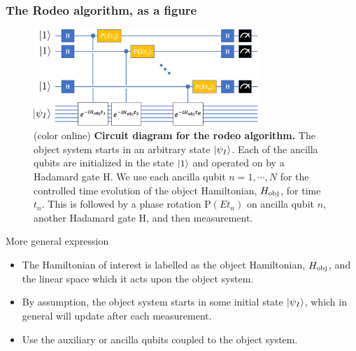 \documentclass{beamer}
\begin{document}
\begin{frame}
\frametitle{The Rodeo algorithm, as a figure}

\begin{figure}
\centering
\includegraphics[width=8.5cm]{rodeofigs/rodeo_circuit.png}
\caption{(color online) {\bf Circuit diagram for the rodeo algorithm.} The object system starts in an arbitrary state $\ket{\psi_I}$.  Each of the ancilla qubits are initialized in the state $\ket{1}$ and operated on by a Hadamard gate H.  We use each ancilla qubit $n=1, \cdots, N$ for the controlled time evolution of the object Hamiltonian, $H_{\rm obj}$, for time $t_n$.  This is followed by a phase rotation P$(Et_n)$ on ancilla qubit $n$, another Hadamard gate H, and then measurement.}
\label{rodeo_circuit}
\end{figure} 

\end{frame}

\begin{frame}{More general expression}
\begin{itemize}
\item The Hamiltonian of interest is labelled as the object
Hamiltonian, $H_{\rm obj}$, and the linear space which it acts upon
the object system.

\item By assumption, the object system starts in some
initial state $\ket{\psi_I}$, which in general will update after each
measurement.

\item Use the auxiliary or ancilla qubits coupled to the object system.
\end{itemize}

\end{frame}
\end{document}
